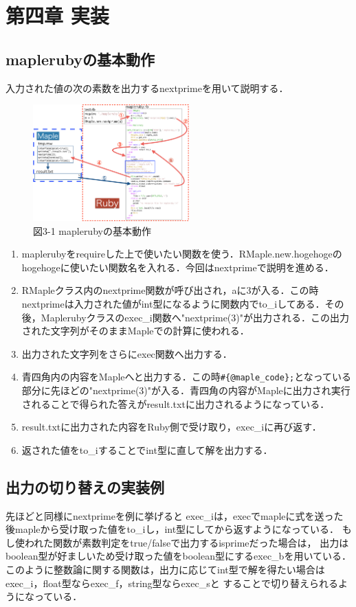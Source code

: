 \section{第四章 実装}
\subsection{maplerubyの基本動作}
入力された値の次の素数を出力するnextprimeを用いて説明する．

\begin{figure}[htbp]\begin{center}
\includegraphics[width=6cm,bb=0 0 442 500]{../figs/./mapleruby_eringi.003.png}
\caption{図3-1 maplerubyの基本動作}
\label{default}\end{center}\end{figure}
\begin{enumerate}
\item maplerubyをrequireした上で使いたい関数を使う．RMaple.new.hogehogeのhogehogeに使いたい関数名を入れる．今回はnextprimeで説明を進める．
\item RMapleクラス内のnextprime関数が呼び出され，aに3が入る．この時nextprimeは入力された値がint型になるように関数内でto\_iしてある．その後，Maplerubyクラスのexec\_i関数へ"nextprime(3)"が出力される．この出力された文字列がそのままMapleでの計算に使われる．
\item 出力された文字列をさらにexec関数へ出力する．
\item 青四角内の内容をMapleへと出力する．この時\verb|#{@maple_code};|となっている部分に先ほどの"nextprime(3)"が入る．青四角の内容がMapleに出力され実行されることで得られた答えがresult.txtに出力されるようになっている．
\item result.txtに出力された内容をRuby側で受け取り，exec\_iに再び返す．
\item 返された値をto\_iすることでint型に直して解を出力する．
\end{enumerate}
\subsection{出力の切り替えの実装例}
先ほどと同様にnextprimeを例に挙げると
exec\_iは，execでmapleに式を送った後mapleから受け取った値をto\_iし，int型にしてから返すようになっている．
もし使われた関数が素数判定をtrue/falseで出力するisprimeだった場合は，
出力はboolean型が好ましいため受け取った値をboolean型にするexec\_bを用いている．
このように整数論に関する関数は，出力に応じてint型で解を得たい場合はexec\_i，float型ならexec\_f，string型ならexec\_sと
することで切り替えられるようになっている．

